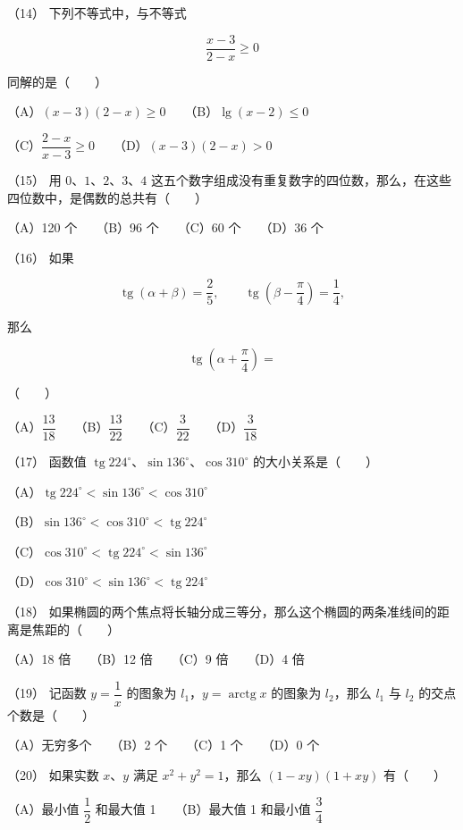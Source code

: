 \begin{answer}
（14） 下列不等式中，与不等式

\nopagebreak[4]
\[
\frac{x-3}{2-x}\geq0
\]

同解的是\mbox{（　　）}

（A）$(x-3)(2-x)\geq0$　　（B）$\lg(x-2)\leq0$

（C）$\dfrac{2-x}{x-3}\geq0$　　（D）$(x-3)(2-x)>0$

（15） 用 $0\text{、}1\text{、}2\text{、}3\text{、}4$ 这五个数字组成没有重复数字的四位数，那么，在这些四位数中，是偶数的总共有\mbox{（　　）}

（A）120 个　　（B）96 个　　（C）60 个　　（D）36 个

（16） 如果

\nopagebreak[4]
\[
\operatorname{tg}(\alpha+\beta)=\frac25,
\qquad \operatorname{tg}\left(\beta-\frac\pi4\right)=\frac14,
\]

那么

\nopagebreak[4]
\[
\operatorname{tg}\left(\alpha+\frac\pi4\right)=
\]

\mbox{（　　）}

（A）$\dfrac{13}{18}$　　（B）$\dfrac{13}{22}$　　（C）$\dfrac3{22}$　　（D）$\dfrac3{18}$

（17） 函数值 $\operatorname{tg}224^\circ\text{、}\sin136^\circ\text{、}\cos310^\circ$ 的大小关系是\mbox{（　　）}

（A）$\operatorname{tg}224^\circ<\sin136^\circ<\cos310^\circ$

（B）$\sin136^\circ<\cos310^\circ<\operatorname{tg}224^\circ$

（C）$\cos310^\circ<\operatorname{tg}224^\circ<\sin136^\circ$

（D）$\cos310^\circ<\sin136^\circ<\operatorname{tg}224^\circ$

（18） 如果椭圆的两个焦点将长轴分成三等分，那么这个椭圆的两条准线间的距离是焦距的\mbox{（　　）}

（A）18 倍　　（B）12 倍　　（C）9 倍　　（D）4 倍

（19） 记函数 $y=\dfrac1x$ 的图象为 $l_1$，$y=\operatorname{arctg} x$ 的图象为 $l_2$，那么 $l_1$ 与 $l_2$ 的交点个数是\mbox{（　　）}

（A）无穷多个　　（B）2 个　　（C）1 个　　（D）0 个

（20） 如果实数 $x\text{、}y$ 满足 $x^2+y^2=1$，那么 $(1-xy)(1+xy)$ 有\mbox{（　　）}

（A）最小值 $\dfrac12$ 和最大值 1　　（B）最大值 1 和最小值 $\dfrac34$


\end{answer}
